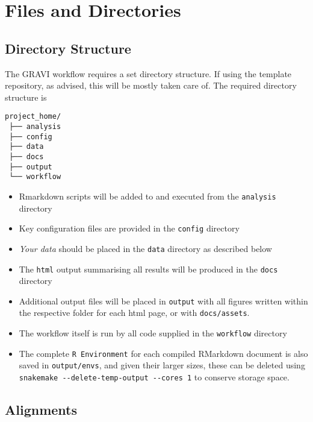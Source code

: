 \documentclass[
]{book}
\providecommand{\tightlist}{%
  \setlength{\itemsep}{0pt}\setlength{\parskip}{0pt}}
\begin{document}
\hypertarget{input-files}{%
\chapter{Files and Directories}\label{input-files}}

\hypertarget{directories}{%
\section{Directory Structure}\label{directories}}

The GRAVI workflow requires a set directory structure.
If using the template repository, as advised, this will be mostly taken care of.
The required directory structure is

\begin{verbatim}
project_home/
 ├── analysis
 ├── config
 ├── data
 ├── docs
 ├── output
 └── workflow
\end{verbatim}

\begin{itemize}
\tightlist
\item
  Rmarkdown scripts will be added to and executed from the \texttt{analysis} directory
\item
  Key configuration files are provided in the \texttt{config} directory
\item
  \emph{Your data} should be placed in the \texttt{data} directory as described below
\item
  The \texttt{html} output summarising all results will be produced in the \texttt{docs} directory
\item
  Additional output files will be placed in \texttt{output} with all figures written within the respective folder for each html page, or with \texttt{docs/assets}.
\item
  The workflow itself is run by all code supplied in the \texttt{workflow} directory
\item
  The complete \texttt{R\ Environment} for each compiled RMarkdown document is also saved in \texttt{output/envs}, and given their larger sizes, these can be deleted using \texttt{snakemake\ -\/-delete-temp-output\ -\/-cores\ 1} to conserve storage space.
\end{itemize}

\hypertarget{alignments}{%
\section{Alignments}\label{alignments}}
\end{document}
